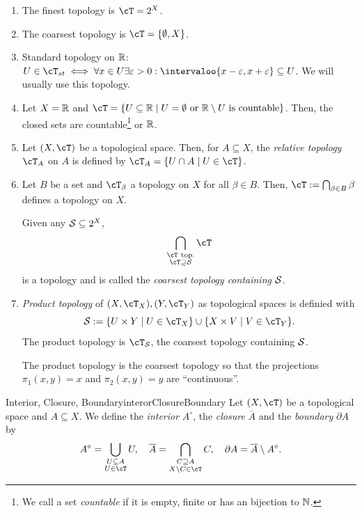 \documentclass[language=english]{../../Template/TemplateLecture}
\begin{document}
\begin{bsp}
    \begin{enumerate}[$(i)$]
        \item The finest topology is $\cT = 2^X$.
        \item The coarsest topology is $\cT = \set{\emptyset, X}$.
        \item Standard topology on $\mathbb{R}$: $U \in \cT_{st} \iff \forall x \in U \exists \varepsilon > 0: \intervaloo{x-\varepsilon, x+\varepsilon} \subseteq U$. We will usually use this topology.
        \item Let $X = \mathbb{R}$ and $\cT = \set{U \subseteq \IR \mid U = \emptyset \text{ or $\IR \setminus U$ is countable}}$. Then, the closed sets are countable\footnote{We call a set \emph{countable} if it is empty, finite or has an bijection to $\mathbb{N}$.} or $\mathbb{R}$. 
        \item Let $(X, \cT)$ be a topological space. Then, for $A \subseteq X$, the \emph{relative topology} $\cT_A$ on $A$ is defined by $\cT_A = \set{U \cap A \mid U \in \cT}$.
        \item Let $B$ be a set and $\cT_\beta$ a topology on $X$ for all $\beta \in B$. Then, $\cT := \bigcap_{\beta \in B} \beta$ defines a topology on $X$.
        
        Given any $\mathcal{S} \subseteq 2^X$,
        \begin{equation}
            \bigcap_{\substack{\cT~\text{top.}\\\cT \supseteq \cS}} \cT
        \end{equation}
        is a topology and is called the \emph{coarsest topology containing $\mathcal{S}$}.
        \item \emph{Product topology} of $(X, \cT_X), (Y, \cT_Y)$ as topological spaces is definied with 
        \begin{equation}
            \cS := \set{U \times Y \mid U \in \cT_X} \cup \set{X \times V \mid V \in \cT_Y}.
        \end{equation}
        The product topology is $\cT_\cS$, the coarsest topology containing $\mathcal{S}$.
        
        The product topology is the coarsest topology so that the projections $\pi_1(x,y) = x$ and $\pi_2(x,y) = y$ are \enquote{continuous}.
    \end{enumerate}
\end{bsp}

\begin{defi}{Interior, Closure, Boundary}{interorClosureBoundary}
    Let $(X, \cT)$ be a topological space and $A \subseteq X$. We define the \emph{interior} $A^\circ$, the \emph{closure} $\overline{A}$ and the \emph{boundary} $\partial A$ by 
    \begin{equation}
        A^\circ = \bigcup_{\substack{U \subseteq A \\ U \in \cT}} U, \quad \overline{A} = \bigcap_{\substack{C \supseteq A \\ X \setminus C \in \cT}} C, \quad \partial A = \overline{A} \setminus A^\circ.
    \end{equation}
\end{defi}
\end{document}
